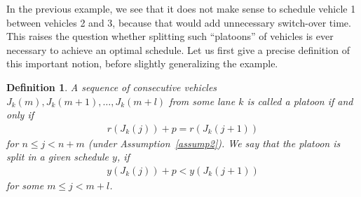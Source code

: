 \documentclass{article}
\theoremstyle{definition}
\theoremstyle{plain}
\newtheorem{define}{Definition}[section]
\begin{document}
In the previous example, we see that it does not make sense to schedule vehicle
1 between vehicles 2 and 3, because that would add unnecessary switch-over
time. This raises the question whether splitting such ``platoons'' of vehicles
is ever necessary to achieve an optimal schedule. Let us first give a precise
definition of this important notion, before slightly generalizing the example.
%
\begin{define}
  A sequence of consecutive vehicles $J_{k}(m), J_{k}(m+1), \dots, J_{k}(m+l)$ from
  some lane $k$ is called a {\normalfont platoon} if and only if
  \begin{align}
  r(J_{k}(j)) + p = r(J_{k}(j+1))
  \end{align}
  for $n \leq j < n + m$ (under Assumption~\ref{assump2}). We say that the
  platoon is {\normalfont split} in a given schedule $y$, if
  \begin{align}
  y(J_{k}(j)) + p < y(J_{k}(j+1))
  \end{align}
  for some $m \leq j < m + l$.
\end{define}
%
\end{document}
